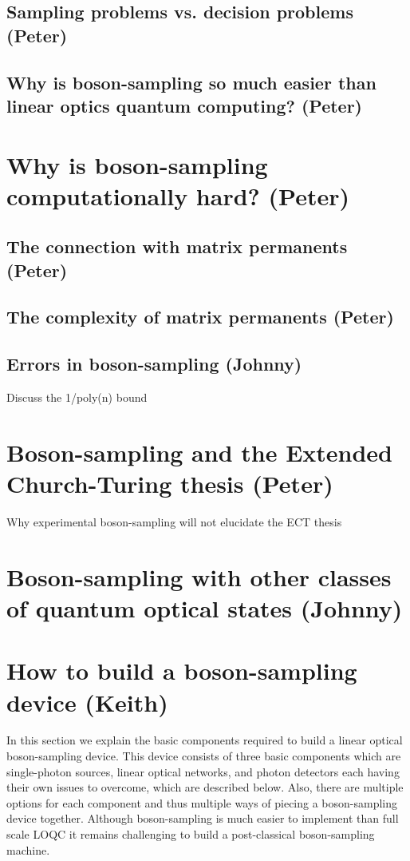 \documentclass[aps,pra,twocolumn,amsmath,amssymb,nofootinbib,superscriptaddress]{revtex4}
\begin{document}
\subsection{Sampling problems vs. decision problems (Peter)}

\subsection{Why is boson-sampling so much easier than linear optics quantum computing? (Peter)}

\section{Why is boson-sampling computationally hard? (Peter)}

\subsection{The connection with matrix permanents (Peter)}

\subsection{The complexity of matrix permanents (Peter)}

\subsection{Errors in boson-sampling (Johnny)}
Discuss the 1/poly(n) bound

\section{Boson-sampling and the Extended Church-Turing thesis (Peter)}
Why experimental boson-sampling will not elucidate the ECT thesis

\section{Boson-sampling with other classes of quantum optical states (Johnny)}

\section{How to build a boson-sampling device (Keith)}

In this section we explain the basic components required to build a linear optical boson-sampling device. This device consists of three basic components which are single-photon sources, linear optical networks, and photon detectors each having their own issues to overcome, which are described below. Also, there are multiple options for each component and thus multiple ways of piecing a boson-sampling device together. Although boson-sampling is much easier to implement than full scale LOQC it remains  challenging to build a post-classical boson-sampling machine. 
\end{document}
